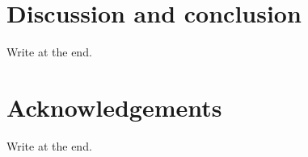 \documentclass[usenatbib]{mnras}
\begin{document}

\section{Discussion and conclusion}
\label{sec:discon}
Write at the end.

\section*{Acknowledgements}
Write at the end.
\end{document}
